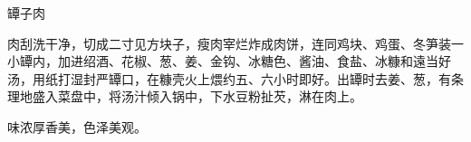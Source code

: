 \begin{recipe}{罈子肉}

\ingredients






\cooking

肉刮洗干净，切成二寸见方块子，瘦肉宰烂炸成肉饼，连同鸡块、鸡蛋、冬笋装一小罈内，加进绍酒、花椒、葱、姜、金钩、冰糖色、酱油、食盐、冰糠和遠当好汤，用纸打湿封严罈口，在糠壳火上煨约五、六小时即好。出罈时去姜、葱，有条理地盛入菜盘中，将汤汁倾入锅中，下水豆粉扯芡，淋在肉上。

\notes

味浓厚香美，色泽美观。

\end{recipe}

